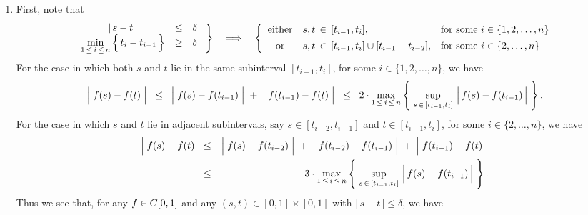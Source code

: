 \proof
\begin{enumerate}
\item	First, note that
		\begin{equation*}
		\left.
		\begin{array}{ccc}
			\vert\,s - t\,\vert &\leq& \delta
			\\
			\underset{1\,\leq\,i\,\leq\,n}{\min}\left\{\,\overset{{\color{white}.}}{t}_{i} - t_{i-1}\,\right\} &\geq& \delta
		\end{array}
		\;\right\}
		\quad\Longrightarrow\quad
		\left\{\begin{array}{cll}
			\textnormal{either} & s,t\,\in\,[t_{i-1},t_{i}], & \textnormal{for some $i\in\{1,2,\ldots,n\}$}
			\\
			\textnormal{or} & s,t\,\overset{{\color{white}1}}{\in}\,[t_{i-1},t_{i}]\cup[t_{i-1}-t_{i-2}], & \textnormal{for some $i\in\{2,\ldots,n\}$}
		\end{array}\right.
		\end{equation*}
		For the case in which both $s$ and $t$ lie in the same subinterval $[t_{i-1},t_{i}]$,
		for some $i\in\{1,2,\ldots,n\}$, we have
		\begin{equation*}
		\left\vert\;f(s)\overset{{\color{white}.}}{-}f(t)\;\right\vert
		\;\;\leq\;\;
			\left\vert\;f(s)\overset{{\color{white}.}}{-}f(t_{i-1})\;\right\vert
			\;+\;\left\vert\;f(t_{i-1})\overset{{\color{white}.}}{-}f(t)\;\right\vert
		\;\;\leq\;\;
			2\cdot\underset{1\,\leq\,i\,\leq\,n}{\max}\left\{\;
				\sup_{s\,\in\,[t_{i-1},t_{i}]}\,\left\vert\,\overset{{\color{white}.}}{f}(s) - f(t_{i-1})\,\right\vert
			\;\right\}.
		\end{equation*}
		For the case in which $s$ and $t$ lie in adjacent subintervals,
		say $s \in [t_{i-2},t_{i-1}]$ and $t \in [t_{i-1},t_{i}]$,
		for some $i\in\{2,\ldots,n\}$, we have
		\begin{eqnarray*}
		\left\vert\;f(s)\overset{{\color{white}.}}{-}f(t)\;\right\vert
		&\leq&
			\left\vert\;f(s)\overset{{\color{white}.}}{-}f(t_{i-2})\;\right\vert
			\;+\;\left\vert\;f(t_{i-2})\overset{{\color{white}.}}{-}f(t_{i-1})\;\right\vert
			\;+\;\left\vert\;f(t_{i-1})\overset{{\color{white}.}}{-}f(t)\;\right\vert
		\\
		&\leq&
			3\cdot\underset{1\,\leq\,i\,\leq\,n}{\max}\left\{\;
				\sup_{s\,\in\,[t_{i-1},t_{i}]}\,\left\vert\,\overset{{\color{white}.}}{f}(s) - f(t_{i-1})\,\right\vert
			\;\right\}.
		\end{eqnarray*}
		Thus we see that,
		for any $f \in C[0,1]$ and any $(s,t)\in[0,1]\times[0,1]$ with $\vert\,s-t\,\vert\leq\delta$, we have

\end{enumerate}
